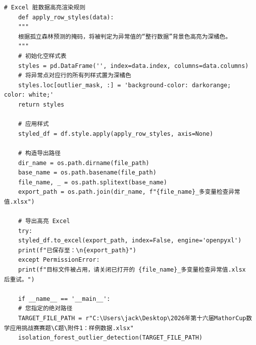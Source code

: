 \documentclass[12pt]{article}
\begin{document}
\begin{lstlisting}[caption={孤立森林异常值检测}, label={code:isolation_forest_outlier}]
	# Excel 脏数据高亮渲染规则
	def apply_row_styles(data):
	"""
	根据孤立森林预测的掩码，将被判定为异常值的“整行数据”背景色高亮为深橘色。
	"""
	# 初始化空样式表
	styles = pd.DataFrame('', index=data.index, columns=data.columns)
	# 将异常点对应行的所有列样式置为深橘色
	styles.loc[outlier_mask, :] = 'background-color: darkorange; color: white;'
	return styles
	
	# 应用样式
	styled_df = df.style.apply(apply_row_styles, axis=None)
	
	# 构造导出路径
	dir_name = os.path.dirname(file_path)
	base_name = os.path.basename(file_path)
	file_name, _ = os.path.splitext(base_name)
	export_path = os.path.join(dir_name, f"{file_name}_多变量检查异常值.xlsx")
	
	# 导出高亮 Excel
	try:
	styled_df.to_excel(export_path, index=False, engine='openpyxl')
	print(f"已保存至：\n{export_path}")
	except PermissionError:
	print(f"目标文件被占用，请关闭已打开的 {file_name}_多变量检查异常值.xlsx 后重试。")
	
	if __name__ == '__main__':
	# 您指定的绝对路径
	TARGET_FILE_PATH = r"C:\Users\jack\Desktop\2026年第十六届MathorCup数学应用挑战赛赛题\C题\附件1：样例数据.xlsx"
	isolation_forest_outlier_detection(TARGET_FILE_PATH)
\end{lstlisting}
\end{document}
